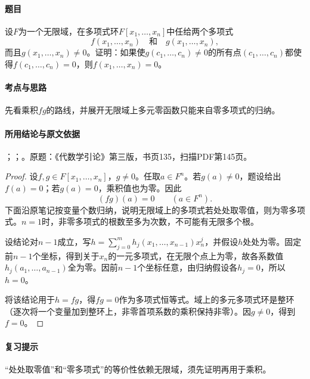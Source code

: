 \paragraph{题目}

设$F$为一个无限域，在多项式环$F[x_1,\ldots,x_n]$中任给两个多项式
\[
f(x_1,\ldots,x_n)\quad\text{和}\quad g(x_1,\ldots,x_n),
\]
而且$g(x_1,\ldots,x_n)\ne0$。证明：如果使$g(c_1,\ldots,c_n)\ne0$的所有点$(c_1,\ldots,c_n)$都使得$f(c_1,\ldots,c_n)=0$，则$f(x_1,\ldots,x_n)=0$。

\paragraph{考点与思路}

先看乘积$fg$的路线，并展开无限域上多元零函数只能来自零多项式的归纳。

\paragraph{所用结论与原文依据}

；；。原题：《代数学引论》第三版，书页135，扫描PDF第145页。


\begin{proof}

设$f,g\in F[x_1,\ldots,x_n]$，$g\ne0$。任取$a\in F^n$。若$g(a)\ne0$，题设给出$f(a)=0$；若$g(a)=0$，乘积值也为零。因此
\[
(fg)(a)=0\qquad(a\in F^n).
\]
下面沿原笔记按变量个数归纳，说明无限域上的多项式若处处取零值，则为零多项式。$n=1$时，非零多项式的根数至多为次数，不可能有无限多个根。

设结论对$n-1$成立，写$h=\sum_{j=0}^m h_j(x_1,\ldots,x_{n-1})x_n^j$，并假设$h$处处为零。固定前$n-1$个坐标，得到关于$x_n$的一元多项式，在无限个点上为零，故各系数值$h_j(a_1,\ldots,a_{n-1})$全为零。因前$n-1$个坐标任意，由归纳假设各$h_j=0$，所以$h=0$。

将该结论用于$h=fg$，得$fg=0$作为多项式恒等式。域上的多元多项式环是整环（逐次将一个变量加到整环上，非零首项系数的乘积保持非零）。因$g\ne0$，得到$f=0$。

\end{proof}

\paragraph{复习提示}

“处处取零值”和“零多项式”的等价性依赖无限域，须先证明再用于乘积。



